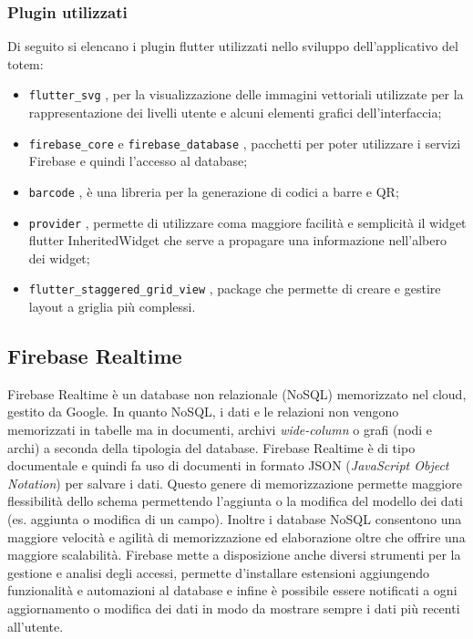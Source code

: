 \subsubsection{Plugin utilizzati}
Di seguito si elencano i plugin flutter utilizzati nello sviluppo dell'applicativo del totem:
\begin{itemize}
    \item \texttt{flutter\_svg} \cite{providerPlugin}, per la visualizzazione delle immagini vettoriali utilizzate per la rappresentazione dei livelli utente e alcuni elementi grafici dell'interfaccia;
    \item \texttt{firebase\_core} \cite{firebaseCorePlugin} e \texttt{firebase\_database} \cite{firebaseDatabasePlugin}, pacchetti per poter utilizzare i servizi Firebase e quindi l'accesso al database;
    \item \texttt{barcode} \cite{barcodePlugin}, è una libreria per la generazione di codici a barre e QR;
    \item \texttt{provider} \cite{providerPlugin}, permette di utilizzare coma maggiore facilità e semplicità il widget flutter InheritedWidget che serve a propagare una informazione nell'albero dei widget;
    \item \texttt{flutter\_staggered\_grid\_view} \cite{staggeredGridView}, package che permette di creare e gestire layout a griglia più complessi.
\end{itemize}
\subsection{Firebase Realtime}
Firebase Realtime \cite{firebase} è un database non relazionale (NoSQL) memorizzato nel cloud, gestito da Google. In quanto NoSQL, i dati e le relazioni non vengono memorizzati in tabelle ma in documenti, archivi \textit{wide-column} o grafi (nodi e archi) a seconda della tipologia del database.
Firebase Realtime è di tipo documentale e quindi fa uso di documenti in formato JSON (\textit{JavaScript Object Notation}) per salvare i dati. Questo genere di memorizzazione permette maggiore flessibilità dello schema permettendo l'aggiunta o la modifica del modello dei dati (es. aggiunta o modifica di un campo). Inoltre i database NoSQL consentono una maggiore velocità e agilità di memorizzazione ed elaborazione oltre che offrire una maggiore scalabilità.
Firebase mette a disposizione anche diversi strumenti per la gestione e analisi degli accessi, permette d'installare estensioni aggiungendo funzionalità e automazioni al database e infine è possibile essere notificati a ogni aggiornamento o modifica dei dati in modo da mostrare sempre i dati più recenti all'utente.

